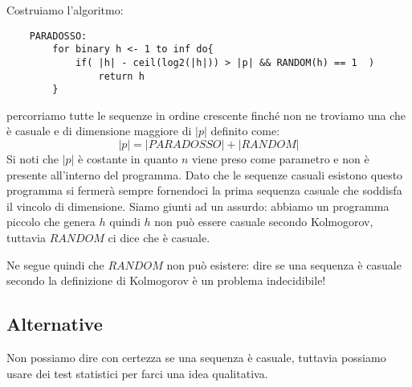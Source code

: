 Costruiamo l'algoritmo:
\begin{verbatim}
    PARADOSSO:
        for binary h <- 1 to inf do{
            if( |h| - ceil(log2(|h|)) > |p| && RANDOM(h) == 1  )
                return h
        }
\end{verbatim}
percorriamo tutte le sequenze in ordine crescente finché non ne troviamo una che è casuale e di dimensione maggiore di $|p|$ definito come:
$$
    |p| = |PARADOSSO| + |RANDOM|
$$
Si noti che $|p|$ è costante in quanto $n$ viene preso come parametro e non è presente all'interno del programma. Dato che le sequenze casuali esistono questo programma si fermerà sempre fornendoci la prima sequenza casuale che soddisfa il vincolo di dimensione. Siamo giunti ad un assurdo: abbiamo un programma piccolo che genera $h$ quindi $h$ non può essere casuale secondo Kolmogorov, tuttavia $RANDOM$ ci dice che è casuale.

Ne segue quindi che $RANDOM$ non può esistere: dire se una sequenza è casuale secondo la definizione di Kolmogorov è un problema indecidibile!

\subsection{Alternative}
Non possiamo dire con certezza se una sequenza è casuale, tuttavia possiamo usare dei test statistici per farci una idea qualitativa.